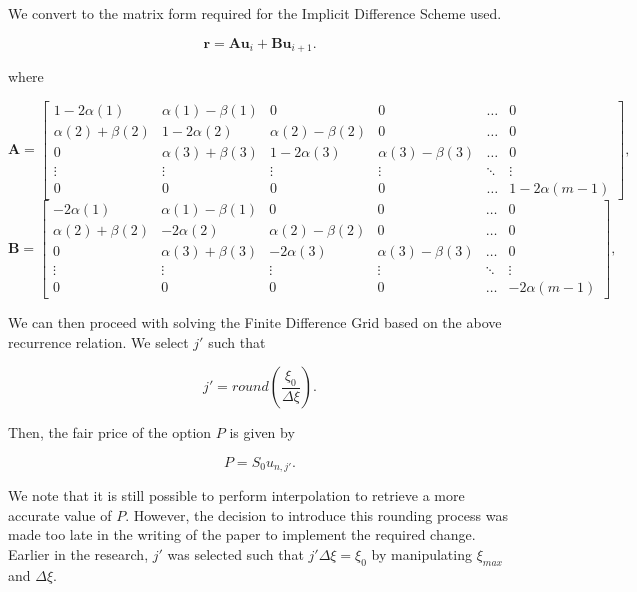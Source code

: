 \documentclass{article}
\begin{document}
We convert to the matrix form required for the Implicit Difference Scheme used.

\begin{equation}
  \textbf{r} = \textbf{Au}_{i} + \textbf{Bu}_{i+1}.
\end{equation}

where

\begin{equation}
  \textbf{A} = \begin{bmatrix}
    1-2\alpha(1) & \alpha(1) - \beta(1) & 0 & 0 & \hdots & 0 \\
    \alpha(2) + \beta(2) & 1-2\alpha(2) & \alpha(2) - \beta(2) & 0 & \hdots & 0 \\
    0 & \alpha(3) + \beta(3) & 1-2\alpha(3) & \alpha(3) - \beta(3) & \hdots & 0 \\
    \vdots & \vdots & \vdots & \vdots & \ddots & \vdots \\
    0 & 0 & 0 & 0 & \hdots & 1-2\alpha(m-1)
  \end{bmatrix},
\end{equation}
\begin{equation}
  \textbf{B} = \begin{bmatrix}
    -2\alpha(1) & \alpha(1) - \beta(1) & 0 & 0 & \hdots & 0 \\
    \alpha(2) + \beta(2) & -2\alpha(2) & \alpha(2) - \beta(2) & 0 & \hdots & 0 \\
    0 & \alpha(3) + \beta(3) & -2\alpha(3) & \alpha(3) - \beta(3) & \hdots & 0 \\
    \vdots & \vdots & \vdots & \vdots & \ddots & \vdots \\
    0 & 0 & 0 & 0 & \hdots & -2\alpha(m-1)
  \end{bmatrix},
\end{equation}

We can then proceed with solving the Finite Difference Grid based on the above recurrence relation. We select \(j'\) such that

\begin{equation}
  j' = round(\frac{\xi_0}{\Delta\xi}).
\end{equation}

Then, the fair price of the option \(P\) is given by

\begin{equation}
  P = S_0 u_{n, j'}.
\end{equation}

We note that it is still possible to perform interpolation to retrieve a more accurate value of \(P\). However, the decision to introduce this rounding process was made too late in the writing of the paper to implement the required change. Earlier in the research, \(j'\) was selected such that \(j'\Delta\xi = \xi_0\) by manipulating \(\xi_{max}\) and \(\Delta\xi\).
\end{document}
